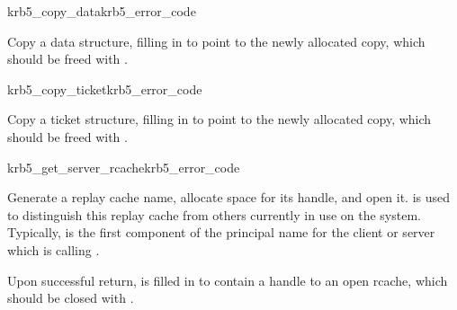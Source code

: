\begin{funcdecl}{krb5_copy_data}{krb5_error_code}{\funcinout}
\funcin
{}
\funcout
{}
\end{funcdecl}

Copy a data structure, filling in  to point to the
newly allocated copy, which should be freed with .

\begin{funcdecl}{krb5_copy_ticket}{krb5_error_code}{\funcinout}
\funcin
{}
\funcout
{}
\end{funcdecl}

Copy a ticket structure, filling in  to point to
the newly allocated copy, which should be freed with
.


\begin{funcdecl}{krb5_get_server_rcache}{krb5_error_code}{\funcinout}
\funcin
{}
\funcout
{}
\end{funcdecl}

Generate a replay cache name, allocate space for its handle, and open
it.   is used to distinguish this replay cache from
others currently in use on the system.  Typically, 
is the first component of the principal name for the client or server
which is calling .

Upon successful return,  is filled in to contain a
handle to an open rcache, which should be closed with
.


